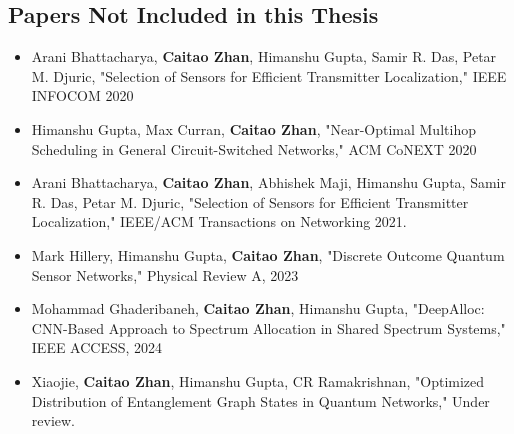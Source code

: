 \subsection*{Papers Not Included in this Thesis}
\begin{itemize}
    \item Arani Bhattacharya, \textbf{Caitao Zhan}, Himanshu Gupta, Samir R. Das, Petar M. Djuric, "Selection of Sensors for Efficient Transmitter Localization," IEEE INFOCOM 2020

    \item Himanshu Gupta, Max Curran, \textbf{Caitao Zhan}, "Near-Optimal Multihop Scheduling in General Circuit-Switched Networks," ACM CoNEXT 2020

    \item Arani Bhattacharya, \textbf{Caitao Zhan}, Abhishek Maji, Himanshu Gupta, Samir R. Das, Petar M. Djuric, "Selection of Sensors for Efficient Transmitter Localization," IEEE/ACM Transactions on Networking 2021.

    \item Mark Hillery, Himanshu Gupta, \textbf{Caitao Zhan}, "Discrete Outcome Quantum Sensor Networks," Physical Review A, 2023

    \item Mohammad Ghaderibaneh, \textbf{Caitao Zhan}, Himanshu Gupta, "DeepAlloc: CNN-Based Approach to Spectrum Allocation in Shared Spectrum Systems," IEEE ACCESS, 2024

    \item Xiaojie, \textbf{Caitao Zhan}, Himanshu Gupta, CR Ramakrishnan, "Optimized Distribution of Entanglement Graph States in Quantum Networks," Under review.
\end{itemize}

